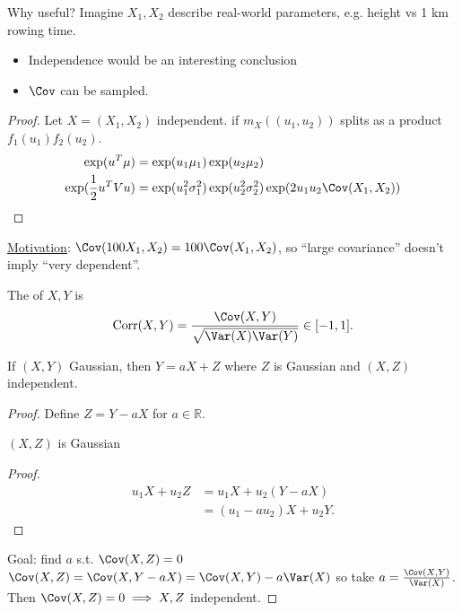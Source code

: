 Why useful?
Imagine $X_1, X_2$ describe real-world parameters, e.g. height vs 1 km rowing time.
\begin{itemize}
    \item Independence would be an interesting conclusion
    \item $\Cov$ can be sampled.
\end{itemize} 

\begin{proof}
    Let $X = (X_1, X_2)$ independent.
    if $m_X \left( (u_1, u_2) \right)$ splits as a product $f_1 (u_1) f_2 (u_2)$.
    \begin{align*}
        \exp(u^T \mu) &= \exp(u_1 \mu_1) \exp(u_2 \mu_2) \\
        \exp(\frac{1}{2} u^T V u) &= \exp(u_1^2 \sigma_1^2) \exp(u_2^2 \sigma_2^2) \exp(2 u_1 u_2 \Cov(X_1, X_2))
    \end{align*} 
\end{proof} 

\underline{Motivation}: $\Cov(100 X_1, X_2) = 100 \Cov(X_1, X_2)$, so ``large covariance'' doesn't imply ``very dependent''.

\begin{definition}[Correlation]
    The  of $X, Y$ is \begin{align*}
        \operatorname{Corr}(X, Y) = \frac{\Cov(X, Y)}{\sqrt{\Var(X) \Var(Y)}} \in [-1, 1].
    \end{align*} 
\end{definition} 

\begin{proposition}
    If $(X, Y)$ Gaussian, then $Y = aX + Z$ where $Z$ is Gaussian and $(X, Z)$ independent.
\end{proposition} 

\begin{proof}
    Define $Z = Y - aX$ for $a \in \mathbb{R}$.

    \begin{claim}
        $(X, Z)$ is Gaussian
    \end{claim} 
    
    \begin{proof}
        \begin{align*}
            u_1 X + u_2 Z &= u_1 X + u_2 (Y - aX) \\
            &= (u_1 - a u_2) X + u_2 Y.
        \end{align*} 
    \end{proof} 
    
    Goal: find $a$ s.t. $\Cov(X, Z) = 0$
    $\Cov(X, Z) = \Cov(X, Y - aX) = \Cov(X, Y) - a\Var(X)$ so take $a = \frac{\Cov(X, Y)}{\Var(X)}$.
    Then $\Cov(X, Z) = 0 \implies X, Z$ independent.
\end{proof} 

